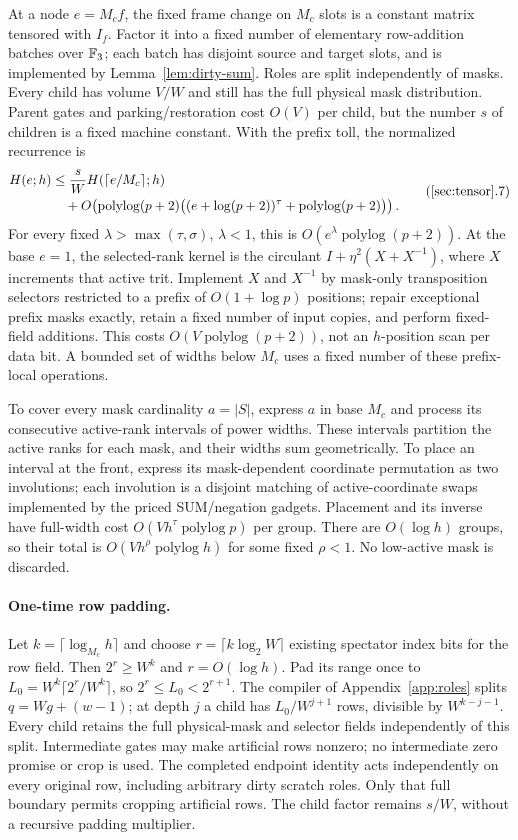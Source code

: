 At a node $e=M_cf$, the fixed frame change on $M_c$ slots is a constant matrix tensored with $I_f$. Factor it into a fixed number of elementary row-addition batches over $\mathbb F_3$; each batch has disjoint source and target slots, and is implemented by Lemma~\ref{lem:dirty-sum}. Roles are split independently of masks. Every child has volume $V/W$ and still has the full physical mask distribution. Parent gates and parking/restoration cost $O(V)$ per child, but the number $s$ of children is a fixed machine constant. With the prefix toll, the normalized recurrence is
\[
 \begin{aligned}
 H(e;h)&\le \frac{s}{W}H(\lceil e/M_c\rceil;h)\\
 &\quad+O\!\left(\operatorname{polylog}(p+2)
 \big((e+\log(p+2))^\tau+\operatorname{polylog}(p+2)\big)\right).
 \end{aligned}
 \tag{\ref{sec:tensor}.7}
\]
For every fixed $\lambda>\max(\tau,\sigma)$, $\lambda<1$, this is $O(e^\lambda\operatorname{polylog}(p+2))$. At the base $e=1$, the selected-rank kernel is the circulant $I+\eta^2(X+X^{-1})$, where $X$ increments that active trit. Implement $X$ and $X^{-1}$ by mask-only transposition selectors restricted to a prefix of $O(1+\log p)$ positions; repair exceptional prefix masks exactly, retain a fixed number of input copies, and perform fixed-field additions. This costs $O(V\operatorname{polylog}(p+2))$, not an $h$-position scan per data bit. A bounded set of widths below $M_c$ uses a fixed number of these prefix-local operations.

To cover every mask cardinality $a=|S|$, express $a$ in base $M_c$ and process its consecutive active-rank intervals of power widths. These intervals partition the active ranks for each mask, and their widths sum geometrically. To place an interval at the front, express its mask-dependent coordinate permutation as two involutions; each involution is a disjoint matching of active-coordinate swaps implemented by the priced SUM/negation gadgets. Placement and its inverse have full-width cost $O(Vh^\tau\operatorname{polylog}p)$ per group. There are $O(\log h)$ groups, so their total is $O(Vh^\rho\operatorname{polylog}h)$ for some fixed $\rho<1$. No low-active mask is discarded.

\paragraph{One-time row padding.} Let $k=\lceil\log_{M_c}h\rceil$ and choose $r=\lceil k\log_2W\rceil$ existing spectator index bits for the row field. Then $2^r\ge W^k$ and $r=O(\log h)$. Pad its range once to $L_0=W^k\lceil2^r/W^k\rceil$, so $2^r\le L_0<2^{r+1}$. The compiler of Appendix~\ref{app:roles} splits $q=Wg+(w-1)$; at depth $j$ a child has $L_0/W^{j+1}$ rows, divisible by $W^{k-j-1}$. Every child retains the full physical-mask and selector fields independently of this split. Intermediate gates may make artificial rows nonzero; no intermediate zero promise or crop is used. The completed endpoint identity acts independently on every original row, including arbitrary dirty scratch roles. Only that full boundary permits cropping artificial rows. The child factor remains $s/W$, without a recursive padding multiplier.


